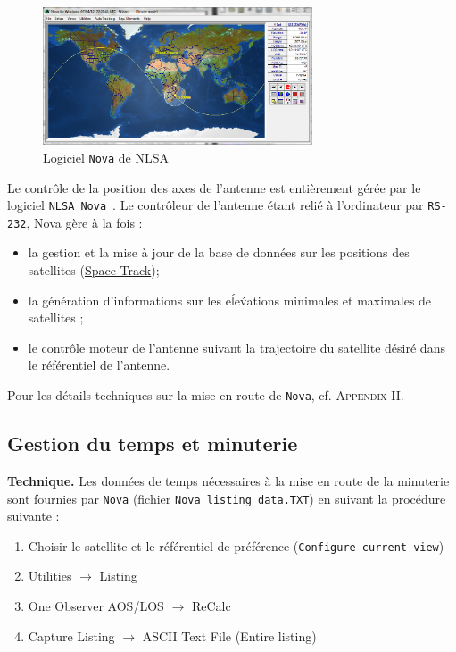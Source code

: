 \documentclass[twocolumn,pre,floats,aps,amsmath,amssymb]{revtex4}
\newenvironment{remark}[1][Remarque.]{\begin{trivlist}
\item[\hskip \labelsep {\bfseries #1}]}{\end{trivlist}}
\begin{document}
\begin{figure}[h]
  \includegraphics[width=8cm]{pictures/nova3.png}
\caption{Logiciel \texttt{Nova} de NLSA}
\label{fig:geometry}
\end{figure}

Le contr\^ole de la position des axes de l'antenne est enti\`erement g\'er\'ee par le logiciel \texttt{NLSA Nova}~\cite{nova_um}. Le contr\^oleur de l'antenne \'etant reli\'e \`a l'ordinateur par \texttt{RS-232}, Nova g\`ere \`a la fois :
\begin{itemize}
\item{la gestion et la mise \`a jour de la base de donn\'ees sur les positions des satellites (\href{https://www.space-track.org}{Space-Track});}
\item{la g\'en\'eration d'informations sur les e\'le\'vations minimales et maximales de satellites ;}
\item{le contr\^ole moteur de l'antenne suivant la trajectoire du satellite d\'esir\'e dans le r\'ef\'erentiel de l'antenne.}
\end{itemize}

\begin{remark}
  Pour les d\'etails techniques sur la mise en route de \texttt{Nova}, cf. \textsc{Appendix II}.
\end{remark}

\subsection{Gestion du temps et minuterie}

\textbf{Technique.} Les donn\'ees de temps n\'ecessaires \`a la mise en route de la minuterie sont fournies par \texttt{Nova} (fichier \texttt{Nova listing data.TXT}) en suivant la proc\'edure suivante :
\begin{enumerate}
\item {Choisir le satellite et le r\'ef\'erentiel de pr\'ef\'erence (\texttt{Configure current view})}
\item {\textup{Utilities} $\rightarrow$ \textup{Listing}}
\item {\textup{One Observer AOS/LOS} $\rightarrow$ \textup{ReCalc}}
\item {\textup{Capture Listing} $\rightarrow$ \textup{ASCII Text File} (Entire listing)}
\end{enumerate}
\end{document}
